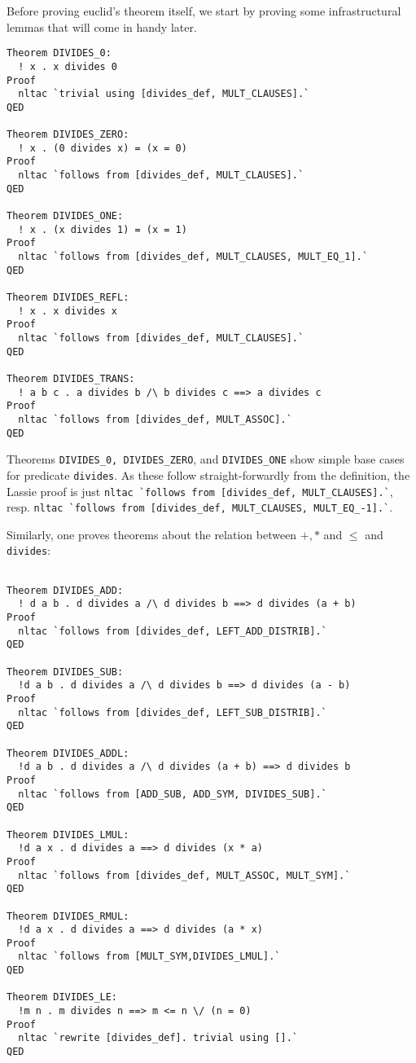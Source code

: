 Before proving euclid's theorem itself, we start by proving some infrastructural
lemmas that will come in handy later.
\begin{lstlisting}
Theorem DIVIDES_0:
  ! x . x divides 0
Proof
  nltac `trivial using [divides_def, MULT_CLAUSES].`
QED

Theorem DIVIDES_ZERO:
  ! x . (0 divides x) = (x = 0)
Proof
  nltac `follows from [divides_def, MULT_CLAUSES].`
QED

Theorem DIVIDES_ONE:
  ! x . (x divides 1) = (x = 1)
Proof
  nltac `follows from [divides_def, MULT_CLAUSES, MULT_EQ_1].`
QED

Theorem DIVIDES_REFL:
  ! x . x divides x
Proof
  nltac `follows from [divides_def, MULT_CLAUSES].`
QED

Theorem DIVIDES_TRANS:
  ! a b c . a divides b /\ b divides c ==> a divides c
Proof
  nltac `follows from [divides_def, MULT_ASSOC].`
QED
\end{lstlisting}

Theorems \lstinline{DIVIDES_0, DIVIDES_ZERO}, and \lstinline{DIVIDES_ONE} show
simple base cases for predicate \lstinline{divides}.
As these follow straight-forwardly from the definition, the Lassie proof is just
\lstinline{nltac `follows from [divides_def, MULT_CLAUSES].`}, resp.
\lstinline{nltac `follows from [divides_def, MULT_CLAUSES, MULT_EQ_-1].`}.

Similarly, one proves theorems about the relation between $+, *$ and $\leq$ and
\lstinline{divides}:
\begin{lstlisting}

Theorem DIVIDES_ADD:
  ! d a b . d divides a /\ d divides b ==> d divides (a + b)
Proof
  nltac `follows from [divides_def, LEFT_ADD_DISTRIB].`
QED

Theorem DIVIDES_SUB:
  !d a b . d divides a /\ d divides b ==> d divides (a - b)
Proof
  nltac `follows from [divides_def, LEFT_SUB_DISTRIB].`
QED

Theorem DIVIDES_ADDL:
  !d a b . d divides a /\ d divides (a + b) ==> d divides b
Proof
  nltac `follows from [ADD_SUB, ADD_SYM, DIVIDES_SUB].`
QED

Theorem DIVIDES_LMUL:
  !d a x . d divides a ==> d divides (x * a)
Proof
  nltac `follows from [divides_def, MULT_ASSOC, MULT_SYM].`
QED

Theorem DIVIDES_RMUL:
  !d a x . d divides a ==> d divides (a * x)
Proof
  nltac `follows from [MULT_SYM,DIVIDES_LMUL].`
QED

Theorem DIVIDES_LE:
  !m n . m divides n ==> m <= n \/ (n = 0)
Proof
  nltac `rewrite [divides_def]. trivial using [].`
QED
\end{lstlisting}

